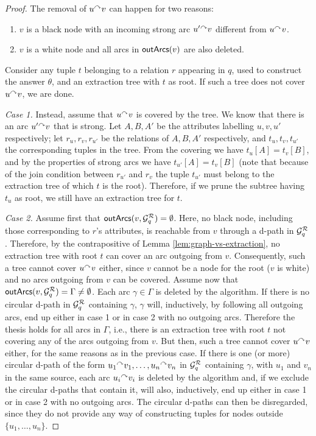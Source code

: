 \begin{proof}
 The removal of $u\mbox{$^{\curvearrowright}$} v$ can happen for two reasons:
 \begin{enumerate}
 \item $v$ is a black node with an incoming strong arc $u'\mbox{$^{\curvearrowright}$} v$ different from $u\mbox{$^{\curvearrowright}$} v$.
 \item $v$ is a white node and all arcs in $\textsf{outArcs}(v)$ are also deleted.
 \end{enumerate}
 
 Consider any tuple $t$ belonging to a relation $r$
 appearing in $q$, used to construct the answer $\theta$, and an extraction
 tree with $t$ as root.  If such a tree does not cover $u\mbox{$^{\curvearrowright}$} v$, we are
 done.  
 
 \textit{Case 1.} Instead, assume that $u\mbox{$^{\curvearrowright}$} v$ is covered by the tree. We know that
 there is an arc $u'\mbox{$^{\curvearrowright}$} v$ that is strong.  Let $A, B, A'$ be the
 attributes labelling $u, v, u'$ respectively; let $r_{u}, r_v, r_{u'}$ be
 the relations of $A, B, A'$ respectively, and $t_{u}, t_v, t_{u'}$ the
 corresponding tuples in the tree.  From the covering we have
 $t_{u}[A]=t_v[B]$, and by the properties of strong arcs we have
 $t_{u'}[A]=t_v[B]$ (note that because of the join condition between $r_{u'}$
 and $r_v$ the tuple $t_{u'}$ must belong to the extraction tree of which $t$ is
 the root).  Therefore, if we prune the subtree having $t_{u}$ as root, we still
 have an extraction tree for $t$.

 \textit{Case 2.} Assume first that $\textsf{outArcs}(v,\mathcal{G}_q^{\mathcal{R}})=\emptyset$. Here, no black node, including those corresponding to $r$'s attributes, is reachable from $v$ through a d-path in $\mathcal{G}_q^{\mathcal{R}}$. Therefore, by the contrapositive of Lemma \ref{lem:graph-vs-extraction}, no extraction tree with root $t$ can cover an arc outgoing from $v$. Consequently, such a tree cannot cover $u\mbox{$^{\curvearrowright}$} v$ either, since $v$ cannot be a node for the root ($v$ is white) and no arcs outgoing from $v$ can be covered.
 Assume now that $\textsf{outArcs}(v,\mathcal{G}_q^{\mathcal{R}})=\Gamma\neq\emptyset$. Each arc $\gamma\in\Gamma$ is deleted by the algorithm. If there is no circular d-path in $\mathcal{G}_q^{\mathcal{R}}$ containing $\gamma$, $\gamma$ will, inductively, by following all outgoing arcs, end up either in case 1 or in case 2 with no outgoing arcs. Therefore the thesis holds for all arcs in $\Gamma$, i.e., there is an extraction tree with root $t$ not covering any of the arcs outgoing from $v$. But then, such a tree cannot cover $u\mbox{$^{\curvearrowright}$} v$ either, for the same reasons as in the previous case. If there is one (or more) circular d-path of the form $u_{1}\mbox{$^{\curvearrowright}$} v_{1},\dots,u_{n}\mbox{$^{\curvearrowright}$} v_{n}$ in $\mathcal{G}_q^{\mathcal{R}}$ containing $\gamma$, with $u_{1}$ and $v_{n}$ in the same source, each arc $u_{i}\mbox{$^{\curvearrowright}$} v_{i}$ is deleted by the algorithm and, if we exclude the circular d-paths that contain it, will also, inductively, end up either in case 1 or in case 2 with no outgoing arcs. The circular d-paths can then be disregarded, since they do not provide any way of constructing tuples for nodes outside $\{u_{1},\dots,u_{n}\}$.
\end{proof}



